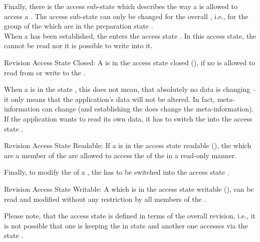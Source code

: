 \documentclass[a4paper, 12pt]{book}
\begin{document}
Finally, there is the access sub-state which describes the way a
 is allowed to access a . The access
sub-state can only be changed for the overall , i.e., for the group of the  which are
in the preparation state \revprepstateACTIVATED.\\
%
When a  has been established, the
 enters the access state \revaccessstateCLOSED. In this
access state, the  cannot be read nor it is possible to
write into it. 
%
\begin{definition*}{Revision Access State Closed: \revaccessstateCLOSED}
  A  is in the access state closed
  (\revaccessstateCLOSED), if no  is allowed to read from
  or write to the .
\end{definition*}
%
When a  is in the state \revaccessstateCLOSED, this does
not mean, that absolutely no data is changing -- it only means that
the application's data will not be altered. In fact, meta-information
can change (and establishing the  does change the
meta-information).\\
%
If the application wants to read its own data, it has to switch the
 into the access state
\revaccessstateREADABLE. 
%
\begin{definition*}{Revision Access State Readable: \revaccessstateREADABLE}
  If a  is in the access state readable
  (\revaccessstateREADABLE), the  which are a member of
  the  are allowed to access the
   of the  in a read-only manner. 
\end{definition*}
%
Finally, to modify the  of a , the
 has to be switched into the access state \revaccessstateWRITABLE.
%
\begin{definition*}{Revision Access State Writable: \revaccessstateWRITABLE}
  A  which is in the access state writable
  (\revaccessstateWRITABLE), can be read and modified without any
  restriction by all members of the .
\end{definition*}


Please note, that the access state is defined in terms of the overall
revision, i.e., it is not possible that one  is keeping
the  in state \revaccessstateREADABLE and another one
accesses via the state \revaccessstateWRITABLE.
\end{document}
